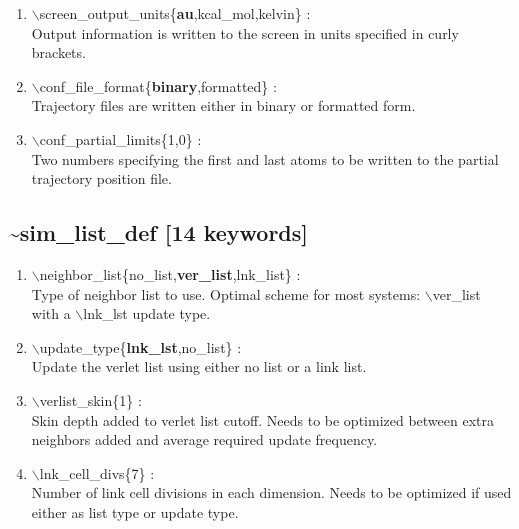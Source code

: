 \documentclass[12pt]{article}
\begin{document}
\begin{enumerate}
 \vspace{0.15in} 
 \item   $\backslash$screen\_output\_units\{{\bf au},kcal\_mol,kelvin\} : \\
   Output information is written to the screen in units specified 
   in curly brackets.

 \vspace{0.15in} 
 \item   $\backslash$conf\_file\_format\{{\bf binary},formatted\} : \\
   Trajectory files are written either in binary or formatted form.

 \vspace{0.15in} 
 \item   $\backslash$conf\_partial\_limits\{1,0\} : \\
   Two numbers specifying the first and last atoms to be written to
   the partial trajectory position file.

\end{enumerate}

\newpage
\subsection*{\bf \~{}sim\_list\_def [14 keywords]}

\begin{enumerate}

 \vspace{0.15in} 
 \item   $\backslash$neighbor\_list\{no\_list,{\bf ver\_list},lnk\_list\} : \\
   Type of neighbor list to use.  Optimal scheme for most systems: 
   $\backslash$ver\_list with a $\backslash$lnk\_lst update type.

 \vspace{0.15in} 
 \item   $\backslash$update\_type\{{\bf lnk\_lst},no\_list\} : \\
   Update the verlet list using either no list or a link list.

 \vspace{0.15in} 
 \item   $\backslash$verlist\_skin\{1\} : \\
   Skin depth added to verlet list cutoff.  Needs to be optimized between
   extra neighbors added and average required update frequency.

 \vspace{0.15in} 
 \item   $\backslash$lnk\_cell\_divs\{7\} : \\
   Number of link cell divisions in each dimension.  Needs to be optimized
   if used either as list type or update type.

\end{enumerate}
\end{document}
